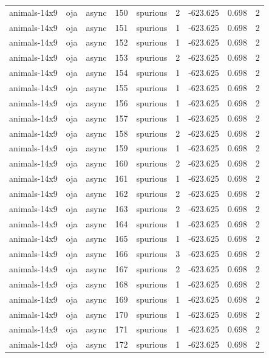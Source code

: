 \begin{tabular}{lllrlrrrr}
animals-14x9 & oja & async & 150 & spurious & 2 & -623.625 & 0.698 & 2 \\
animals-14x9 & oja & async & 151 & spurious & 1 & -623.625 & 0.698 & 2 \\
animals-14x9 & oja & async & 152 & spurious & 1 & -623.625 & 0.698 & 2 \\
animals-14x9 & oja & async & 153 & spurious & 2 & -623.625 & 0.698 & 2 \\
animals-14x9 & oja & async & 154 & spurious & 1 & -623.625 & 0.698 & 2 \\
animals-14x9 & oja & async & 155 & spurious & 1 & -623.625 & 0.698 & 2 \\
animals-14x9 & oja & async & 156 & spurious & 1 & -623.625 & 0.698 & 2 \\
animals-14x9 & oja & async & 157 & spurious & 1 & -623.625 & 0.698 & 2 \\
animals-14x9 & oja & async & 158 & spurious & 2 & -623.625 & 0.698 & 2 \\
animals-14x9 & oja & async & 159 & spurious & 1 & -623.625 & 0.698 & 2 \\
animals-14x9 & oja & async & 160 & spurious & 2 & -623.625 & 0.698 & 2 \\
animals-14x9 & oja & async & 161 & spurious & 1 & -623.625 & 0.698 & 2 \\
animals-14x9 & oja & async & 162 & spurious & 2 & -623.625 & 0.698 & 2 \\
animals-14x9 & oja & async & 163 & spurious & 2 & -623.625 & 0.698 & 2 \\
animals-14x9 & oja & async & 164 & spurious & 1 & -623.625 & 0.698 & 2 \\
animals-14x9 & oja & async & 165 & spurious & 1 & -623.625 & 0.698 & 2 \\
animals-14x9 & oja & async & 166 & spurious & 3 & -623.625 & 0.698 & 2 \\
animals-14x9 & oja & async & 167 & spurious & 2 & -623.625 & 0.698 & 2 \\
animals-14x9 & oja & async & 168 & spurious & 1 & -623.625 & 0.698 & 2 \\
animals-14x9 & oja & async & 169 & spurious & 1 & -623.625 & 0.698 & 2 \\
animals-14x9 & oja & async & 170 & spurious & 1 & -623.625 & 0.698 & 2 \\
animals-14x9 & oja & async & 171 & spurious & 1 & -623.625 & 0.698 & 2 \\
animals-14x9 & oja & async & 172 & spurious & 1 & -623.625 & 0.698 & 2 \\

\end{tabular}
